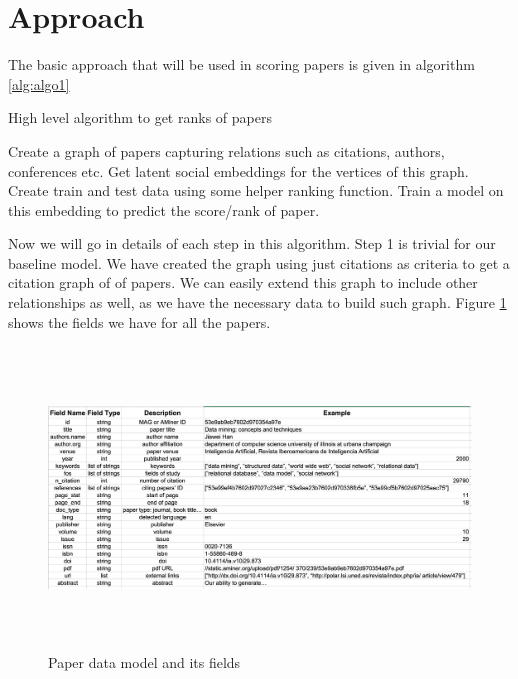 \documentclass[a4paper, 11pt]{article}
\begin{document}
\section{Approach}
The basic approach that will be used in scoring papers is given in algorithm \ref{alg:algo1}
\begin{algorithm}
\caption{High level algorithm to get ranks of papers}
\label{alg:algo1}
\begin{algorithmic}[1]
\State Create a graph of papers capturing relations such as citations, authors, conferences etc.
\State Get latent social embeddings for the vertices of this graph. 
\State Create train and test data using some helper ranking function.
\State Train a model on this embedding to predict the score/rank of paper.
\end{algorithmic}
\end{algorithm}
Now we will go in details of each step in this algorithm. Step 1 is trivial for our baseline model. We have created the graph using just citations as criteria to get a citation graph of of papers. We can easily extend this graph to include other relationships as well, as we have the necessary data to build such graph. Figure \ref{fig:datamodel} shows the fields we have for all the papers.


\begin{figure}[h]
    \centering
    \includegraphics[width=17cm,height=8cm]{datamodel_new}
    \caption{Paper data model and its fields \cite{data}}
    \label{fig:datamodel}
\end{figure}
\end{document}
